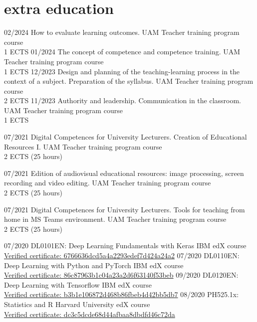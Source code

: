 \documentclass[]{friggeri-cv}
\begin{document}
\section{extra education}
\begin{entrylist}
\entry
    {02/2024}
    {How to evaluate learning outcomes.}
    {UAM}
    {Teacher training program course\\
    1 ECTS
    }
\entry
    {01/2024}
    {The concept of competence and competence training.}
    {UAM}
    {Teacher training program course\\
    1 ECTS
    }
\entry
    {12/2023}
    {Design and planning of the teaching-learning process in the context of a subject. Preparation of the syllabus.}
    {UAM}
    {Teacher training program course\\
    2 ECTS
    }
\entry
    {11/2023}
    {Authority and leadership. Communication in the classroom.}
    {UAM}
    {Teacher training program course\\
    1 ECTS
    }
    
\entry
    {07/2021}
    {Digital Competences for University Lecturers. Creation of Educational Resources I.}
    {UAM}
    {Teacher training program course\\
    2 ECTS (25 hours)
    }
    
\entry
    {07/2021}
    {Edition of audiovisual educational resources: image processing, screen recording and video editing.}
    {UAM}
    {Teacher training program course\\
    2 ECTS (25 hours)
    }

\entry
    {07/2021}
    {Digital Competences for University Lecturers. Tools for teaching from home in MS Teams environment.}
    {UAM}
    {Teacher training program course\\
    2 ECTS (25 hours)
    }
    
\entry
    {07/2020}
    {DL0101EN: Deep Learning Fundamentals with Keras}
    {IBM}
    {edX course\\
    {\href{https://courses.edx.org/certificates/6766636dcd5a4a2293edef7d424a24a2}{Verified certificate: 6766636dcd5a4a2293edef7d424a24a2}}
    }
\entry
    {07/2020}
    {DL0110EN: Deep Learning with Python and PyTorch}
    {IBM}
    {edX course\\
    {\href{https://courses.edx.org/certificates/86c87963b1c04a23a2d6f63140f53beb}{Verified certificate: 86c87963b1c04a23a2d6f63140f53beb}}
    }
  \entry
    {09/2020}
    {DL0120EN: Deep Learning with Tensorflow}
    {IBM}
    {edX course\\
    {\href{https://courses.edx.org/certificates/b3b1e106872d468b86fbeb4d42bb5db7}{Verified certificate: b3b1e106872d468b86fbeb4d42bb5db7}}
    } 
    \entry
    {08/2020}
    {PH525.1x: Statistics and R}
    {Harvard University}
    {edX course\\
    {\href{https://courses.edx.org/certificates/dc3c5dcde68d44afbaa8dbdfd46c72da}{Verified certificate: dc3c5dcde68d44afbaa8dbdfd46c72da}}
    }
    

\end{entrylist}
\end{document}
